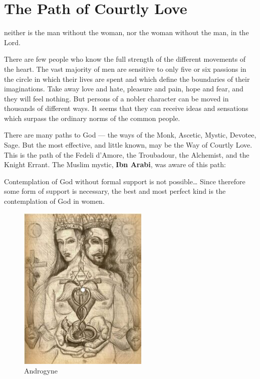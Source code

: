 \section{The Path of Courtly Love}

\begin{quotex}
neither is the man without the woman, nor the woman without the man, in the Lord. 

\end{quotex}

\begin{quotex}
There are few people who know the full strength of the different movements of the heart. The vast majority of men are sensitive to only five or six passions in the circle in which their lives are spent and which define the boundaries of their imaginations. Take away love and hate, pleasure and pain, hope and fear, and they will feel nothing. But persons of a nobler character can be moved in thousands of different ways. It seems that they can receive ideas and sensations which surpass the ordinary norms of the common people. 

\end{quotex}
There are many paths to God — the ways of the Monk, Ascetic, Mystic, Devotee, Sage. But the most effective, and little known, may be the Way of Courtly Love. This is the path of the Fedeli d'Amore, the Troubadour, the Alchemist, and the Knight Errant. The Muslim mystic, \textbf{Ibn Arabi}, was aware of this path:

\begin{quotex}
Contemplation of God without formal support is not possible… Since therefore some form of support is necessary, the best and most perfect kind is the contemplation of God in women. 

\end{quotex}

\begin{figure}\centering
 \includegraphics[scale=.6]{a20210207ThePathofCourtlyLove-img001.jpg} 
\caption{Androgyne}
\end{figure}

